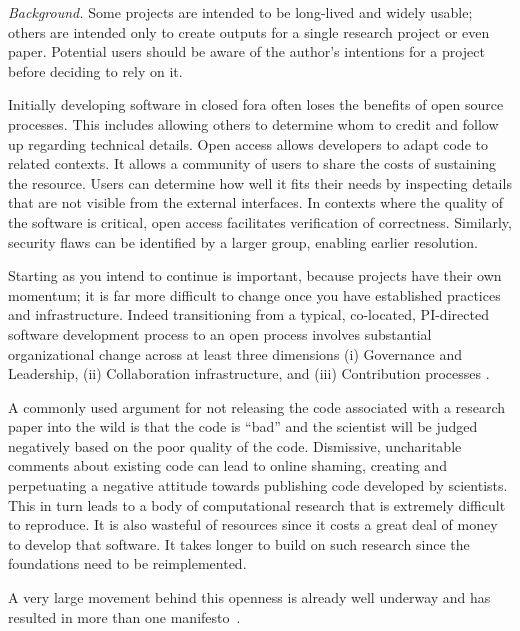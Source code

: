 \documentclass[a4paper,UKenglish]{dagman}
\begin{document}
\emph{Background.}
Some projects are intended to be long-lived and widely usable; others are intended only to create outputs for a single research project or even paper. Potential users should be aware of the author's intentions for a project before deciding to rely on it.  

Initially developing software in closed fora often loses the benefits of open source processes. This includes allowing others to determine whom to credit and follow up regarding technical details. Open access allows developers to adapt code to related contexts. It allows a community of users to share the costs of sustaining the resource. Users can determine how well it fits their needs by inspecting details that are not visible from the external interfaces. In contexts where the quality of the software is critical, open access facilitates verification of correctness. Similarly, security flaws can be identified by a larger group, enabling earlier resolution.

Starting as you intend to continue is important, because projects have their own momentum; it is far more difficult to change once you have established practices and infrastructure. Indeed transitioning from a typical, co-located, PI-directed software development process to an open process involves substantial organizational change across at least three dimensions (i) Governance and Leadership, (ii) Collaboration infrastructure, and (iii) Contribution processes \cite{howison2014collaboration}.

A commonly used argument for not releasing the code associated with a research paper into the wild is that the code is ``bad'' and the scientist will be judged negatively based on the poor quality of the code.
Dismissive, uncharitable comments about existing code can lead to online shaming, creating and perpetuating a negative attitude towards publishing code developed by scientists.
This in turn leads to a body of computational research that is extremely difficult to reproduce. It is also wasteful of resources since it costs a great deal of money to develop that software. It takes longer to build on such research since the foundations need to be reimplemented.

A very large movement behind this openness is already well underway and has resulted in more than one manifesto~\cite{barba_reproducibility_2012,alex_holcombe_open_2011}.
\end{document}
